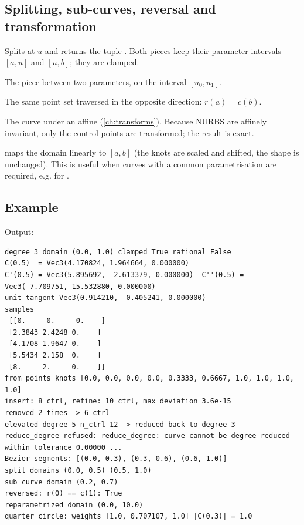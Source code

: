 \subsection{Splitting, sub-curves, reversal and transformation}

\begin{description}[style=nextline]
\item[\code{split(u)}] Splits at $u$ and returns the tuple . Both pieces keep
  their parameter intervals $[a, u]$ and $[u, b]$; they are clamped.
\item[\code{sub_curve(u0, u1)}] The piece between two parameters, on the interval $[u_0, u_1]$.
\item[\code{reversed()}] The same point set traversed in the opposite direction: $r(a) = c(b)$.
\item[\code{transformed(transform)}] The curve under an affine 
  (\cref{ch:transforms}). Because NURBS are affinely invariant, only the control points are
  transformed; the result is exact.
\end{description}

 maps the domain linearly to $[a, b]$ (the knots are
scaled and shifted, the shape is unchanged). This is useful when curves with a common
parametrisation are required, e.g. for .

\subsection{Example}


Output:

\begin{lstlisting}[style=text]
degree 3 domain (0.0, 1.0) clamped True rational False
C(0.5)  = Vec3(4.170824, 1.964664, 0.000000)
C'(0.5) = Vec3(5.895692, -2.613379, 0.000000)  C''(0.5) = Vec3(-7.709751, 15.532880, 0.000000)
unit tangent Vec3(0.914210, -0.405241, 0.000000)
samples
 [[0.     0.     0.    ]
 [2.3843 2.4248 0.    ]
 [4.1708 1.9647 0.    ]
 [5.5434 2.158  0.    ]
 [8.     2.     0.    ]]
from_points knots [0.0, 0.0, 0.0, 0.0, 0.3333, 0.6667, 1.0, 1.0, 1.0, 1.0]
insert: 8 ctrl, refine: 10 ctrl, max deviation 3.6e-15
removed 2 times -> 6 ctrl
elevated degree 5 n_ctrl 12 -> reduced back to degree 3
reduce_degree refused: reduce_degree: curve cannot be degree-reduced within tolerance 0.00000 ...
Bezier segments: [(0.0, 0.3), (0.3, 0.6), (0.6, 1.0)]
split domains (0.0, 0.5) (0.5, 1.0)
sub_curve domain (0.2, 0.7)
reversed: r(0) == c(1): True
reparametrized domain (0.0, 10.0)
quarter circle: weights [1.0, 0.707107, 1.0] |C(0.3)| = 1.0
\end{lstlisting}

